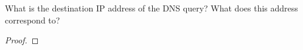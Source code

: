 \documentclass[../../main.tex]{subfiles}
\begin{document}
\begin{wts}
What is the destination IP address of the DNS query? What does this address correspond to?
\end{wts}
\begin{proof}

\end{proof}
\end{document}

